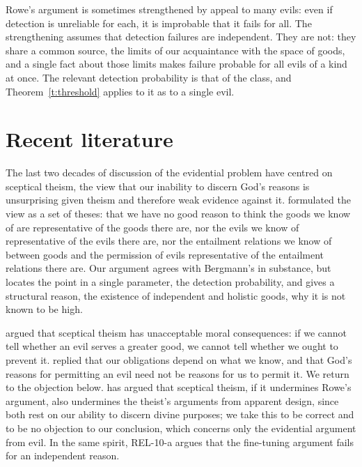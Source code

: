 \documentclass{situationist-preprint}
\begin{document}
\begin{remark}\label{r:many}
Rowe's argument is sometimes strengthened by appeal to many evils: even if detection is unreliable for each, it is improbable that it fails for all. The strengthening assumes that detection failures are independent. They are not: they share a common source, the limits of our acquaintance with the space of goods, and a single fact about those limits makes failure probable for all evils of a kind at once. The relevant detection probability is that of the class, and Theorem~\ref{t:threshold} applies to it as to a single evil.
\end{remark}

\section{Recent literature}\label{s:literature}

The last two decades of discussion of the evidential problem have centred on sceptical theism, the view that our inability to discern God's reasons is unsurprising given theism and therefore weak evidence against it. \citet{Bergmann2001} formulated the view as a set of theses: that we have no good reason to think the goods we know of are representative of the goods there are, nor the evils we know of representative of the evils there are, nor the entailment relations we know of between goods and the permission of evils representative of the entailment relations there are. Our argument agrees with Bergmann's in substance, but locates the point in a single parameter, the detection probability, and gives a structural reason, the existence of independent and holistic goods, why it is not known to be high.

\citet{AlmeidaOppy2003} argued that sceptical theism has unacceptable moral consequences: if we cannot tell whether an evil serves a greater good, we cannot tell whether we ought to prevent it. \citet{BergmannRea2005} replied that our obligations depend on what we know, and that God's reasons for permitting an evil need not be reasons for us to permit it. We return to the objection below. \citet{Draper2013} has argued that sceptical theism, if it undermines Rowe's argument, also undermines the theist's arguments from apparent design, since both rest on our ability to discern divine purposes; we take this to be correct and to be no objection to our conclusion, which concerns only the evidential argument from evil. In the same spirit, REL-10-a argues that the fine-tuning argument fails for an independent reason.
\end{document}
